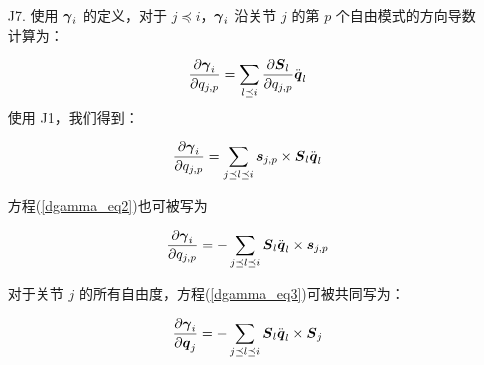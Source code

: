 \documentclass[letterpaper, 10 pt, conference]{ieeetran}  %
\begin{document}
{\begin{enumerate}
使用空间向量交叉性质 P1、$\xibar_{i}$ 的定义并化简，

\begin{equation}
    \begin{aligned}
        \frac{\partial \xibar_{i}}{\partial \q_{j}} = \sum_{j \preceq l \preceq i} -(\vJ{l} \times \Psibardot_{j}) - ( \v_{l} \times \vJ{l} ) \times  \Phibar_{j}  
       \label{dxi_eq6}
    \end{aligned}
\end{equation}

对各项求和并化简，我们得到：

\begin{equation}
    \begin{aligned}
       \frac{\partial \xibar_{i}}{\partial \q_{j}} =   (\v_{\lambda(j)} - \v_{i})  \times  \Psibardot_{j} + 
       ( \xibar_{\lambda(j)} - \xibar_{i}) \times  \Phibar_{j}  
       \label{dxi_eq7}
    \end{aligned}
\end{equation}

\item[J7.] 使用 $\boldsymbol{\gamma}_{i}$ 的定义，对于 $j \preceq i$，$\boldsymbol{\gamma}_{i}$ 沿关节 $j$ 的第 $p$ 个自由模式的方向导数计算为：

\begin{equation}
    \frac{\partial \gammabar_{i}}{\partial q_{j,p}} = \sum_{l \preceq i} \frac{\partial \Phibar_{l}}{\partial q_{j,p}}  \qdd_{l}
    \label{dgamma_eq1}
\end{equation}
使用 J1，我们得到：

\begin{equation}
    \frac{\partial \gammabar_{i}}{\partial q_{j,p}} = \sum_{j \preceq l \preceq i} \phibar_{j,p} \times \Phibar_{l} \qdd_{l}
\label{dgamma_eq2}
\end{equation}

方程(\ref{dgamma_eq2})也可被写为

\begin{equation}
    \frac{\partial \gammabar_{i}}{\partial q_{j,p}} = - \sum_{j \preceq l \preceq i} \Phibar_{l} \qdd_{l}  \times \phibar_{j,p}
\label{dgamma_eq3}
\end{equation}

对于关节 $j$ 的所有自由度，方程(\ref{dgamma_eq3})可被共同写为：

\begin{equation}
    \frac{\partial \gammabar_{i}}{\partial \q_{j}} =  - \sum_{j \preceq l \preceq i} \Phibar_{l} \qdd_{l}  \times \Phibar_{j}
\label{dgamma_eq4}
\end{equation}


\end{enumerate}}
\end{document}

